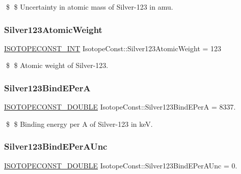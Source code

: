 \$ \$ Uncertainty in atomic mass of Silver-\/123 in amu. \mbox{\label{group___isotope_const-_silver-_ag123_ga46f9fad19ca9ca3470ff608cbd2fea33}} 
\subsubsection{\texorpdfstring{Silver123\+Atomic\+Weight}{Silver123AtomicWeight}}
{\footnotesize\ttfamily \mbox{\hyperlink{group___isotope_const-_macros_ga5f18360b3e99483a35c32d789e62621c}{I\+S\+O\+T\+O\+P\+E\+C\+O\+N\+S\+T\+\_\+\+I\+NT}} Isotope\+Const\+::\+Silver123\+Atomic\+Weight = 123}

\$ \$ Atomic weight of Silver-\/123. \mbox{\label{group___isotope_const-_silver-_ag123_ga9c28f8e4efda66412a935577a3b23743}} 
\subsubsection{\texorpdfstring{Silver123\+Bind\+E\+PerA}{Silver123BindEPerA}}
{\footnotesize\ttfamily \mbox{\hyperlink{group___isotope_const-_macros_ga8f45a7272ce02c0b4c65c44636ed719a}{I\+S\+O\+T\+O\+P\+E\+C\+O\+N\+S\+T\+\_\+\+D\+O\+U\+B\+LE}} Isotope\+Const\+::\+Silver123\+Bind\+E\+PerA = 8337.}

\$ \$ Binding energy per A of Silver-\/123 in keV. \mbox{\label{group___isotope_const-_silver-_ag123_ga7b58f250d6ff7ea5077028c3b8f5371e}} 
\subsubsection{\texorpdfstring{Silver123\+Bind\+E\+Per\+A\+Unc}{Silver123BindEPerAUnc}}
{\footnotesize\ttfamily \mbox{\hyperlink{group___isotope_const-_macros_ga8f45a7272ce02c0b4c65c44636ed719a}{I\+S\+O\+T\+O\+P\+E\+C\+O\+N\+S\+T\+\_\+\+D\+O\+U\+B\+LE}} Isotope\+Const\+::\+Silver123\+Bind\+E\+Per\+A\+Unc = 0.}

